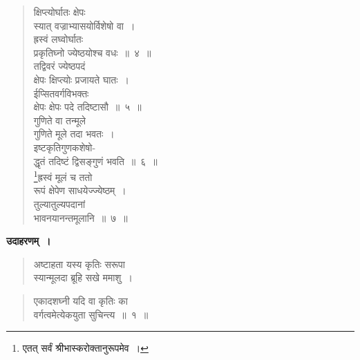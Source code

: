 \documentclass[11pt, openany]{book}
\begin{document}
 \label{10.4}
\begin{quote}
{\gk क्षिप्त्योर्घातः क्षेपः\\
स्यात् वज्राभ्यासयोर्विशेषो वा~।\\
ह्रस्वं लघ्वोर्घातः\\
प्रकृतिघ्नो ज्येष्ठयोश्च वधः~॥~४~॥\\
तद्विवरं ज्येष्ठपदं\\
क्षेपः क्षिप्त्योः प्रजायते घातः~।\\
ईप्सितवर्गविभक्तः\\
क्षेपः क्षेपः पदे तदिष्टासौ~॥~५~॥\\
गुणिते वा तन्मूले\\
गुणिते मूले तदा भवतः~।\\
इष्टकृतिगुणकशेषो-\\
द्धृतं तदिष्टं द्विसङ्गुणं भवति~॥~६~॥\\
\renewcommand{\thefootnote}{१}\footnote{एतत् सर्वं श्रीभास्करोक्तानुरूपमेव~।}ह्रस्वं मूलं च ततो\\
रूपं क्षेपेण साधयेज्ज्येष्ठम्~।\\
तुल्यातुल्यपदानां\\
भावनयानन्तमूलानि~॥~७~॥}
\end{quote} 

\textbf{उदाहरणम्~।} 

\begin{quote}
{\ex अष्टाहता यस्य कृतिः सरूपा\\
स्यान्मूलदा ब्रूहि सखे ममाशु~।}
\end{quote}

\newpage

\begin{quote}
{\ex एकादशघ्नी यदि वा कृतिः का\\
वर्गत्वमेत्येकयुता सुचिन्त्य~॥~१~॥~}
\end{quote}
\end{document}

